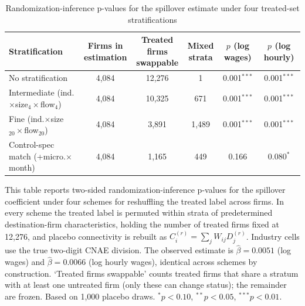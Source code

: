 \begin{table}[H]
\centering
\scriptsize
\caption{Randomization-inference p-values for the spillover estimate under four treated-set stratifications}
\label{tab:placebo_diag}
\begin{tabular}{lccccc}
\toprule
Stratification & \shortstack{Firms in\\estimation} & \shortstack{Treated firms\\swappable} & \shortstack{Mixed\\strata} & \shortstack{$p$\\(log wages)} & \shortstack{$p$\\(log hourly)} \\
\midrule
No stratification & 4,084 & 12,276 & 1 & 0.001$^{***}$ & 0.001$^{***}$ \\
Intermediate (ind.$\times$size$_4\times$flow$_4$) & 4,084 & 10,325 & 671 & 0.001$^{***}$ & 0.001$^{***}$ \\
Fine (ind.$\times$size$_{20}\times$flow$_{20}$) & 4,084 & 3,891 & 1,489 & 0.001$^{***}$ & 0.001$^{***}$ \\
Control-spec match (+micro.$\times$month) & 4,084 & 1,165 & 449 & 0.166 & 0.080$^{*}$ \\
\bottomrule
\end{tabular}
\begin{minipage}{0.92\textwidth}\vspace{4pt}\scriptsize
This table reports two-sided randomization-inference p-values for the spillover coefficient under four schemes for reshuffling the treated label across firms. In every scheme the treated label is permuted within strata of predetermined destination-firm characteristics, holding the number of treated firms fixed at 12,276, and placebo connectivity is rebuilt as $C_i^{(r)}=\sum_j W_{ij} D_j^{(r)}$. Industry cells use the true two-digit CNAE division. The observed estimate is $\hat\beta=0.0051$ (log wages) and $\hat\beta=0.0066$ (log hourly wages), identical across schemes by construction. `Treated firms swappable' counts treated firms that share a stratum with at least one untreated firm (only these can change status); the remainder are frozen. Based on 1,000 placebo draws. $^{*}p<0.10$, $^{**}p<0.05$, $^{***}p<0.01$.
\end{minipage}
\end{table}